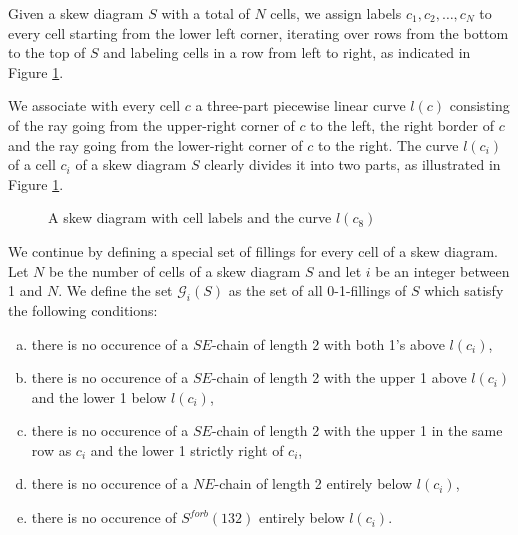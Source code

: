 Given a skew diagram $S$ with a total of $N$ cells, we assign labels $c_1, c_2, \ldots, c_N$ to every cell starting from the lower left
corner, iterating over rows from the bottom to the top of $S$ and labeling cells in a row from left to right, as indicated in Figure 
\ref{figure_cell_labels}.

We associate with every cell $c$ a three-part piecewise linear curve $l(c)$ consisting of the ray going from the upper-right corner of $c$
to the left, the right border of $c$ and the ray going from the lower-right corner of $c$ to the right. The curve $l(c_i)$
of a cell $c_i$ of a skew diagram $S$ clearly divides it into two parts, as illustrated in Figure \ref{figure_cell_labels}.

\begin{figure}[h]
\centering
{}
\caption{A skew diagram with cell labels and the curve $l(c_8)$}
\label{figure_cell_labels}
\end{figure}

We continue by defining a special set of fillings for every cell of a skew diagram.
Let $N$ be the number of cells of a skew diagram $S$ and let $i$ be an integer between 1 and $N$. We define the set $\mathcal{G}_i(S)$
as the set of all 0-1-fillings of $S$ which satisfy the following conditions:
\begin{enumerate}[(a)]
\item there is no occurence of a $SE$-chain of length 2 with both 1's above $l(c_i)$,
\item there is no occurence of a $SE$-chain of length 2 with the upper 1 above $l(c_i)$ and the lower 1 below $l(c_i)$,
\item there is no occurence of a $SE$-chain of length 2 with the upper 1 in the same row as $c_i$ and the lower 1 strictly right of $c_i$,
\item there is no occurence of a $NE$-chain of length 2 entirely below $l(c_i)$,
\item there is no occurence of $S^{forb}(132)$ entirely below $l(c_i)$.
\end{enumerate}

